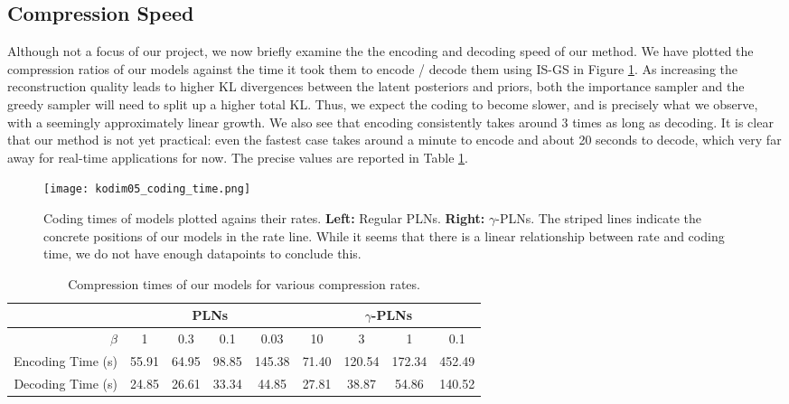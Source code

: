 \subsection{Compression Speed}
\par
Although not a focus of our project, we now briefly examine the the encoding and
decoding speed of our method. We have plotted the compression ratios of our
models against the time it took them to encode / decode them using IS-GS in
Figure \ref{fig:kodim05_coding_time}. As increasing the reconstruction quality
leads to higher KL divergences between the latent posteriors and priors, both the
importance sampler and the greedy sampler will need to split up a higher total
KL. Thus, we expect the coding to become slower, and is precisely what we
observe, with a seemingly approximately linear growth. We also see that encoding
consistently takes around 3 times as long as decoding. It is clear that our
method is not yet practical:
even the fastest case takes around a minute to encode and about 20 seconds to
decode, which very far away for real-time applications for now. The precise
values are reported in Table \ref{tab:kodim05_coding_time}.
\begin{figure}
  \centering
  \texttt{[image: kodim05\_coding\_time.png]}
  \caption[Coding times of models plotted agains their rates.]
  {Coding times of models plotted agains their rates. \textbf{Left:}
    Regular PLNs. \textbf{Right:} $\gamma$-PLNs. The striped lines indicate
    the concrete positions of our models in the rate line. While it seems
    that there is a
    linear relationship between rate and coding time, we do not have enough
    datapoints to conclude this.}
  \label{fig:kodim05_coding_time}
\end{figure}

\begin{table}[]
  \centering
  \begin{tabular}{|r||c|c|c|c||c|c|c|c|}
    \hline
    & \multicolumn{4}{c||}{\textbf{PLNs}} & \multicolumn{4}{c|}{\textbf{$\gamma$-PLNs}} \\
    \hline 
    $\beta$ & 1 & 0.3 & 0.1 & 0.03 & 10 & 3 & 1 & 0.1 \\ 
    \hline\hline
    Encoding Time (s) & 55.91 & 64.95 & 98.85 & 145.38 & 71.40 & 120.54 & 172.34 & 452.49 \\
    \hline
    Decoding Time (s) & 24.85 & 26.61 & 33.34 & 44.85 & 27.81 & 38.87 & 54.86 & 140.52 \\
    \hline
  \end{tabular}
  \caption{Compression times of our models for various compression rates.}
  \label{tab:kodim05_coding_time}
\end{table}